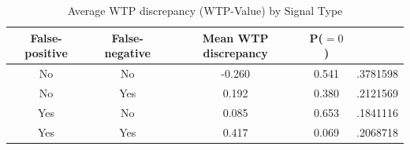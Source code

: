 \begin{table}[H]\centering \caption{Average WTP discrepancy (WTP-Value) by Signal Type} \begin{tabular}{cccc} \hline \hline
\textbf{False-positive}&\textbf{False-negative}&\textbf{Mean WTP discrepancy}& \textbf{P($=0$)}\\ \hline
No&No&-0.260&0.541&.3781598\\
No&Yes&0.192&0.380&.2121569\\
Yes&No&0.085&0.653&.1841116\\
Yes&Yes&0.417&0.069&.2068718\\
\hline \end{tabular} \end{table}
